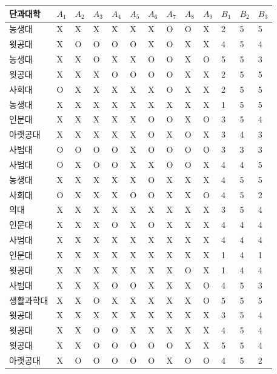 \documentclass[11pt,a4paper]{article}
\begin{document}
\begin{center}
\begin{supertabular}{ | p{2cm} | x{0.5cm} | x{0.5cm} | x{0.5cm} | x{0.5cm} | x{0.5cm} | x{0.5cm} | x{0.5cm} | x{0.5cm} | x{0.5cm} | x{0.5cm} | x{0.5cm} | x{0.5cm} | }
\hline
단과대학 & $A_1$ & $A_2$ & $A_3$ & $A_4$ & $A_5$ & $A_6$ & $A_7$ & $A_8$ & $A_9$ & $B_1$ & $B_2$ & $B_3$ \\
\hline
농생대 & X & X & X & X & X & X & O & O & X & 2 & 5 & 5 \\
윗공대 & X & O & O & O & O & X & O & X & X & 4 & 5 & 4 \\
농생대 & X & X & O & X & X & O & O & X & O & 5 & 5 & 3 \\
윗공대 & X & X & X & O & O & O & O & X & X & 2 & 5 & 5 \\
사회대 & O & X & X & X & X & X & O & X & X & 2 & 5 & 5 \\
농생대 & X & X & X & X & X & X & X & X & X & 1 & 5 & 5 \\
인문대 & X & X & X & X & X & O & O & X & O & 3 & 5 & 4 \\
아랫공대 & X & X & X & X & X & O & X & O & X & 3 & 4 & 3 \\
사범대 & O & O & O & O & X & O & O & O & O & 3 & 3 & 3 \\
사범대 & O & X & O & O & X & X & O & O & X & 4 & 4 & 5 \\
농생대 & X & X & X & X & X & O & X & X & X & 4 & 5 & 5 \\
사회대 & O & X & X & X & O & O & X & X & O & 4 & 5 & 2 \\
의대 & X & X & X & X & X & X & X & X & X & 3 & 5 & 4 \\
인문대 & X & X & X & O & X & O & X & X & X & 4 & 4 & 4 \\
사범대 & X & X & X & X & X & X & X & X & X & 4 & 4 & 4 \\
인문대 & X & X & X & X & X & X & X & X & X & 1 & 4 & 1 \\
윗공대 & X & X & X & X & X & X & X & O & X & 1 & 4 & 4 \\
사범대 & X & X & X & O & O & X & X & X & O & 4 & 5 & 3 \\
생활과학대 & X & X & O & X & X & X & X & X & O & 5 & 5 & 5 \\
윗공대 & X & X & X & X & X & X & X & X & X & 3 & 5 & 4 \\
윗공대 & X & X & O & O & X & X & X & X & X & 4 & 5 & 4 \\
윗공대 & X & X & O & O & O & O & O & X & X & 5 & 5 & 4 \\
아랫공대 & X & O & O & O & O & O & X & O & O & 4 & 5 & 2 \\

\end{supertabular}
\end{center}
\end{document}

